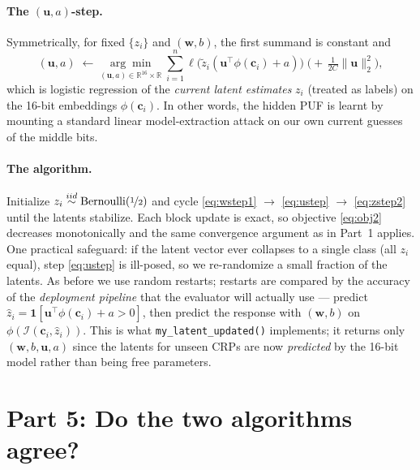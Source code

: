 \documentclass{article}
\newcommand{\vw}{\mathbf{w}}
\newcommand{\vu}{\mathbf{u}}
\newcommand{\vc}{\mathbf{c}}
\newcommand{\R}{\mathbb{R}}
\newcommand{\ins}{\mathcal{I}}
\begin{document}
\paragraph{The $(\vu, a)$-step.}
Symmetrically, for fixed $\{z_i\}$ and $(\vw, b)$, the first summand is constant and
\begin{equation}
  \label{eq:ustep}
  (\vu, a) \;\leftarrow\; \underset{(\vu, a) \in \R^{16}\times\R}{\arg\min}\;
  \sum_{i=1}^{n} \ell\!\big( \tilde z_i (\vu^\top \phi(\vc_i) + a) \big)
  \;\Big(+\, \tfrac{1}{2C}\|\vu\|_2^2\Big),
\end{equation}
which is logistic regression of the \emph{current latent estimates} $z_i$ (treated as labels)
on the 16-bit embeddings $\phi(\vc_i)$. In other words, the hidden PUF is learnt by mounting
a standard linear model-extraction attack on our own current guesses of the middle bits.

\paragraph{The algorithm.}
Initialize $z_i \overset{iid}{\sim} \text{Bernoulli}(\nicefrac12)$ and cycle
\eqref{eq:wstep1} $\to$ \eqref{eq:ustep} $\to$ \eqref{eq:zstep2} until the latents stabilize.
Each block update is exact, so objective \eqref{eq:obj2} decreases monotonically and the same
convergence argument as in Part~1 applies. One practical safeguard: if the latent vector ever
collapses to a single class (all $z_i$ equal), step \eqref{eq:ustep} is ill-posed, so we
re-randomize a small fraction of the latents. As before we use random restarts; restarts are
compared by the accuracy of the \emph{deployment pipeline} that the evaluator will actually
use --- predict $\hat z_i = \mathbf{1}[\vu^\top \phi(\vc_i) + a > 0]$, then predict the
response with $(\vw, b)$ on $\phi(\ins(\vc_i, \hat z_i))$. This is what
\texttt{my\_latent\_updated()} implements; it returns only $(\vw, b, \vu, a)$ since the
latents for unseen CRPs are now \emph{predicted} by the 16-bit model rather than being free
parameters.

\section{Part 5: Do the two algorithms agree?}
\end{document}
